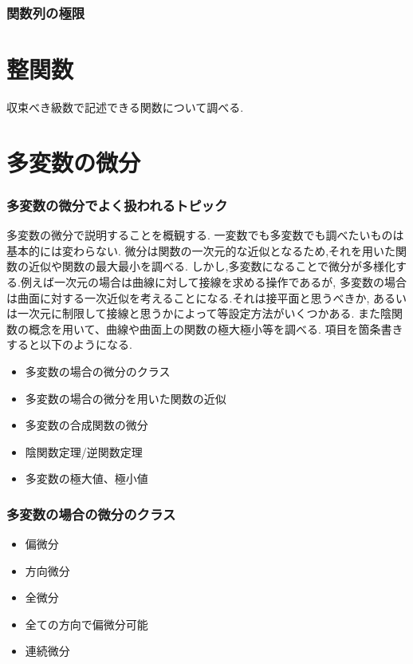 \documentclass{ujarticle}
\begin{document}
\begin{thm}[平均値の定理]

\end{thm}

\begin{thm}[テイラーの定理]

\end{thm}

\begin{thm}[ロピタルの定理]

\end{thm}

\section{関数列の極限}

\part{整関数}
収束べき級数で記述できる関数について調べる.


\part{多変数の微分}
\section{多変数の微分でよく扱われるトピック}
多変数の微分で説明することを概観する.
一変数でも多変数でも調べたいものは基本的には変わらない.
微分は関数の一次元的な近似となるため,それを用いた関数の近似や関数の最大最小を調べる.
しかし,多変数になることで微分が多様化する.例えば一次元の場合は曲線に対して接線を求める操作であるが,
多変数の場合は曲面に対する一次近似を考えることになる.それは接平面と思うべきか,
あるいは一次元に制限して接線と思うかによって等設定方法がいくつかある.
また陰関数の概念を用いて、曲線や曲面上の関数の極大極小等を調べる.
項目を箇条書きすると以下のようになる.

\begin{itemize}
  \item  多変数の場合の微分のクラス
  \item  多変数の場合の微分を用いた関数の近似
  \item  多変数の合成関数の微分
  \item  陰関数定理/逆関数定理
  \item  多変数の極大値、極小値
\end{itemize}

\section{多変数の場合の微分のクラス}
\begin{itemize}
\item 偏微分
\item 方向微分
\item 全微分
\item 全ての方向で偏微分可能
\item 連続微分
\end{itemize}
\end{document}
